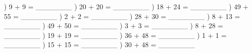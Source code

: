 \documentclass{article}%
\begin{document}
) 9 + 9 = \_\_\_\_\_\_\_%
\newline%
\newline%
) 20 + 20 = \_\_\_\_\_\_\_%
\newline%
\newline%
) 18 + 24 = \_\_\_\_\_\_\_%
\newline%
\newline%
) 49 + 55 = \_\_\_\_\_\_\_%
\newline%
\newline%
) 2 + 2 = \_\_\_\_\_\_\_%
\newline%
\newline%
) 28 + 30 = \_\_\_\_\_\_\_%
\newline%
\newline%
) 8 + 13 = \_\_\_\_\_\_\_%
\newline%
\newline%
) 49 + 50 = \_\_\_\_\_\_\_%
\newline%
\newline%
) 3 + 3 = \_\_\_\_\_\_\_%
\newline%
\newline%
) 8 + 28 = \_\_\_\_\_\_\_%
\newline%
\newline%
) 19 + 19 = \_\_\_\_\_\_\_%
\newline%
\newline%
) 36 + 48 = \_\_\_\_\_\_\_%
\newline%
\newline%
) 1 + 1 = \_\_\_\_\_\_\_%
\newline%
\newline%
) 15 + 15 = \_\_\_\_\_\_\_%
\newline%
\newline%
) 30 + 48 = \_\_\_\_\_\_\_%
\newline%
\end{document}
